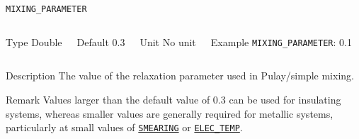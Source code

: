 \begin{frame}[allowframebreaks]{\texttt{MIXING\_PARAMETER}} \label{MIXING_PARAMETER}
\vspace*{-12pt}
\begin{columns}
\begin{block}{Type}
Double
\end{block}

\begin{block}{Default}
0.3
\end{block}

\begin{block}{Unit}
No unit
\end{block}

\begin{block}{Example}
\texttt{MIXING\_PARAMETER}: 0.1
\end{block}
\end{columns}

\begin{block}{Description}
The value of the relaxation parameter used in Pulay/simple mixing.
\end{block}

\begin{block}{Remark}
Values larger than the default value of 0.3 can be used for insulating systems, whereas smaller values are generally required for metallic  systems, particularly at small values of \hyperlink{SMEARING}{\texttt{SMEARING}} or \hyperlink{ELEC_TEMP}{\texttt{ELEC\_TEMP}}.
\end{block}

\end{frame}


